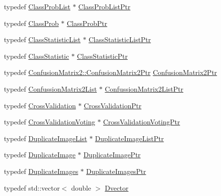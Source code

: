 \begin{DoxyCompactItemize}
\item 
typedef \hyperlink{class_k_k_m_l_l_1_1_class_prob_list}{Class\+Prob\+List} $\ast$ \hyperlink{namespace_k_k_m_l_l_a60f96a524ddb189eff2b4391cf0b651c}{Class\+Prob\+List\+Ptr}
\item 
typedef \hyperlink{class_k_k_m_l_l_1_1_class_prob}{Class\+Prob} $\ast$ \hyperlink{namespace_k_k_m_l_l_aac4f1402b049fe046f3fa6c789a0c5d0}{Class\+Prob\+Ptr}
\item 
typedef \hyperlink{class_k_k_m_l_l_1_1_class_statistic_list}{Class\+Statistic\+List} $\ast$ \hyperlink{namespace_k_k_m_l_l_a94c12d8466d389018764e996caebf7a1}{Class\+Statistic\+List\+Ptr}
\item 
typedef \hyperlink{class_k_k_m_l_l_1_1_class_statistic}{Class\+Statistic} $\ast$ \hyperlink{namespace_k_k_m_l_l_a85182174e5ae7ba508dad118983b37bc}{Class\+Statistic\+Ptr}
\item 
typedef \hyperlink{class_k_k_m_l_l_1_1_confusion_matrix2_a5e15dd38f24b2b85399c2e43d649bb9a}{Confusion\+Matrix2\+::\+Confusion\+Matrix2\+Ptr} \hyperlink{namespace_k_k_m_l_l_a724c9a3c5315800e128adf68253e91ae}{Confusion\+Matrix2\+Ptr}
\item 
typedef \hyperlink{class_k_k_m_l_l_1_1_confussion_matrix2_list}{Confussion\+Matrix2\+List} $\ast$ \hyperlink{namespace_k_k_m_l_l_a003f81204ad8e351f5333ff873ae8796}{Confussion\+Matrix2\+List\+Ptr}
\item 
typedef \hyperlink{class_k_k_m_l_l_1_1_cross_validation}{Cross\+Validation} $\ast$ \hyperlink{namespace_k_k_m_l_l_af409490d63bba2b6556dc135aa140c1b}{Cross\+Validation\+Ptr}
\item 
typedef \hyperlink{class_k_k_m_l_l_1_1_cross_validation_voting}{Cross\+Validation\+Voting} $\ast$ \hyperlink{namespace_k_k_m_l_l_a221f35ca38b5daf6019c2d69aa2bd38b}{Cross\+Validation\+Voting\+Ptr}
\item 
typedef \hyperlink{class_k_k_m_l_l_1_1_duplicate_image_list}{Duplicate\+Image\+List} $\ast$ \hyperlink{namespace_k_k_m_l_l_a0d6bd9e8744f7f256c866b6d88739d23}{Duplicate\+Image\+List\+Ptr}
\item 
typedef \hyperlink{class_k_k_m_l_l_1_1_duplicate_image}{Duplicate\+Image} $\ast$ \hyperlink{namespace_k_k_m_l_l_a55d6f703b6c805f96dc6af66f31d2be5}{Duplicate\+Image\+Ptr}
\item 
typedef \hyperlink{class_k_k_m_l_l_1_1_duplicate_images}{Duplicate\+Images} $\ast$ \hyperlink{namespace_k_k_m_l_l_ac205a681bc0fe894edaf427ea8add62d}{Duplicate\+Images\+Ptr}
\item 
typedef std\+::vector$<$ double $>$ \hyperlink{namespace_k_k_m_l_l_a4cdbae7e3075ec073ae28b98c8017a2c}{Dvector}

\end{DoxyCompactItemize}
